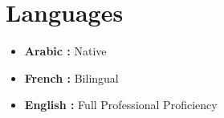 \documentclass[letterpaper,11pt]{article}
\begin{document}
\section{Languages}
\begin{multicols}{3}
    \begin{itemize}[itemsep=0pt, parsep=0pt, left=0pt, label={}]
        \item\small\columnbreak \textbf{Arabic :} Native
        \item\small\columnbreak \textbf{French :} Bilingual
        \item\small\columnbreak \textbf{English :} Full Professional Proficiency
            \end{itemize}
\end{multicols}
    
\end{document}

